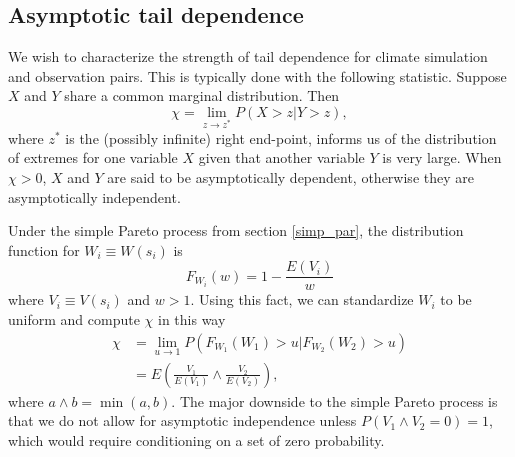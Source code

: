 \subsection{Asymptotic tail dependence}

We wish to characterize the strength of tail dependence for climate simulation and observation pairs. This is typically done with the following statistic. Suppose $X$ and $Y$ share a common marginal distribution. Then
\[ \chi = \lim_{z\rightarrow z^*} P(X>z| Y>z), \]
where $z^*$ is the (possibly infinite) right end-point, informs us of the distribution of extremes for one variable $X$ given that another variable $Y$ is very large. When $\chi>0$, $X$ and $Y$ are said to be asymptotically dependent, otherwise they are asymptotically independent.

Under the simple Pareto process from section \ref{simp_par}, the distribution function for $W_i\equiv W(s_i)$ is
\[ F_{W_i}(w) = 1 - \frac{E(V_i)}{w} \]
where $V_i\equiv V(s_i)$ and $w>1$. Using this fact, we can standardize $W_i$ to be uniform and compute $\chi$ in this way
\begin{align}
\chi &= \lim_{u\rightarrow 1} P(F_{W_1}(W_1) > u | F_{W_2}(W_2) > u) \nonumber \\
&= E\left(\frac{V_1}{E(V_1)} \wedge \frac{V_2}{E(V_2)}\right), \label{ppchi}
\end{align}
where $a \wedge b=\min(a,b)$. The major downside to the simple Pareto process is that we do not allow for asymptotic independence unless $P(V_1 \wedge V_2=0)=1$, which would require conditioning on a set of zero probability.

